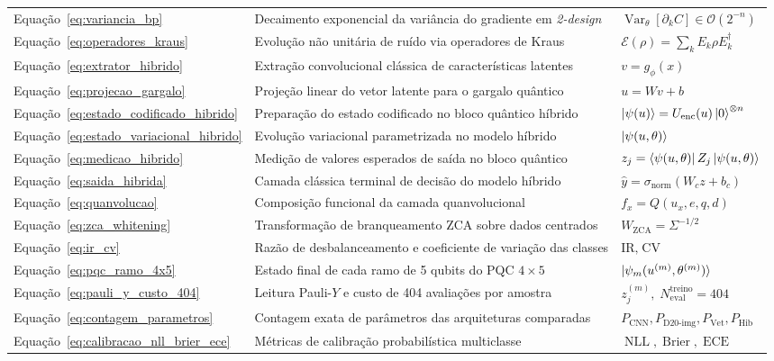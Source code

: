 \documentclass[
    12pt,
    openright,
    oneside,
    a4paper,
    english,
    brazil
]{abntex2}
\begin{document}
\begin{longtable}{@{}p{2.9cm}p{7.8cm}p{\dimexpr\textwidth-10.7cm-4\tabcolsep\relax}@{}}
Equação~\eqref{eq:variancia_bp} & Decaimento exponencial da variância do gradiente em \textit{2-design} & \(\operatorname{Var}_\theta[\partial_k C] \in \mathcal{O}(2^{-n})\) \\
Equação~\eqref{eq:operadores_kraus} & Evolução não unitária de ruído via operadores de Kraus & \(\mathcal{E}(\rho) = \sum_k E_k\rho E_k^\dagger\) \\
Equação~\eqref{eq:extrator_hibrido} & Extração convolucional clássica de características latentes & \(v = g_\phi(x)\) \\
Equação~\eqref{eq:projecao_gargalo} & Projeção linear do vetor latente para o gargalo quântico & \(u = Wv + b\) \\
Equação~\eqref{eq:estado_codificado_hibrido} & Preparação do estado codificado no bloco quântico híbrido & \(\ket{\psi(u)} = U_{\text{enc}}(u)\ket{0}^{\otimes n}\) \\
Equação~\eqref{eq:estado_variacional_hibrido} & Evolução variacional parametrizada no modelo híbrido & \(\ket{\psi(u,\theta)}\) \\
Equação~\eqref{eq:medicao_hibrido} & Medição de valores esperados de saída no bloco quântico & \(z_j = \bra{\psi(u,\theta)}Z_j\ket{\psi(u,\theta)}\) \\
Equação~\eqref{eq:saida_hibrida} & Camada clássica terminal de decisão do modelo híbrido & \(\hat{y} = \sigma_{\text{norm}}(W_c z + b_c)\) \\
Equação~\eqref{eq:quanvolucao} & Composição funcional da camada quanvolucional & \(f_x = Q(u_x, e, q, d)\) \\
Equação~\eqref{eq:zca_whitening} & Transformação de branqueamento ZCA sobre dados centrados & \(W_{\text{ZCA}} = \Sigma^{-1/2}\) \\
Equação~\eqref{eq:ir_cv} & Razão de desbalanceamento e coeficiente de variação das classes & \(\text{IR},\; \text{CV}\) \\
Equação~\eqref{eq:pqc_ramo_4x5} & Estado final de cada ramo de 5 qubits do PQC \(4 \times 5\) & \(\ket{\psi_m(u^{(m)},\theta^{(m)})}\) \\
Equação~\eqref{eq:pauli_y_custo_404} & Leitura Pauli-\(Y\) e custo de 404 avaliações por amostra & \(z_j^{(m)},\; N_{\text{eval}}^{\text{treino}} = 404\) \\
Equação~\eqref{eq:contagem_parametros} & Contagem exata de parâmetros das arquiteturas comparadas & \(P_{\text{CNN}}, P_{\text{D20-img}}, P_{\text{Vet}}, P_{\text{Hib}}\) \\
Equação~\eqref{eq:calibracao_nll_brier_ece} & Métricas de calibração probabilística multiclasse & \(\operatorname{NLL}, \operatorname{Brier}, \operatorname{ECE}\) \\

\end{longtable}
\end{document}
